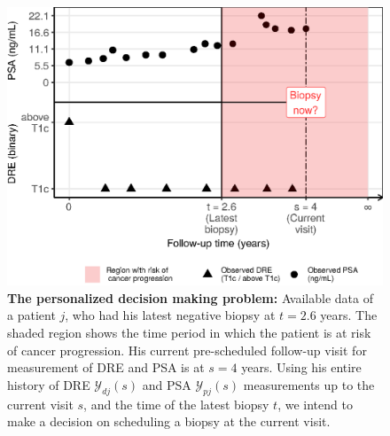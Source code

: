 
\begin{figure}[!htb]
\captionsetup{justification=justified}
\centerline{\includegraphics[width=\columnwidth]{images/obsDataPlot_2340.eps}}
\caption{\textbf{The personalized decision making problem:} Available data of a patient $j$, who had his latest negative biopsy at $t=2.6$ years. The shaded region shows the time period in which the patient is at risk of cancer progression. His current pre-scheduled follow-up visit for measurement of DRE and PSA is at $s=4$ years. Using his entire history of DRE $\mathcal{Y}_{dj}(s)$ and PSA $\mathcal{Y}_{pj}(s)$ measurements up to the current visit $s$, and the time of the latest biopsy $t$, we intend to make a decision on scheduling a biopsy at the current visit.}
\label{fig:obsDataPlot_2340}
\end{figure}

